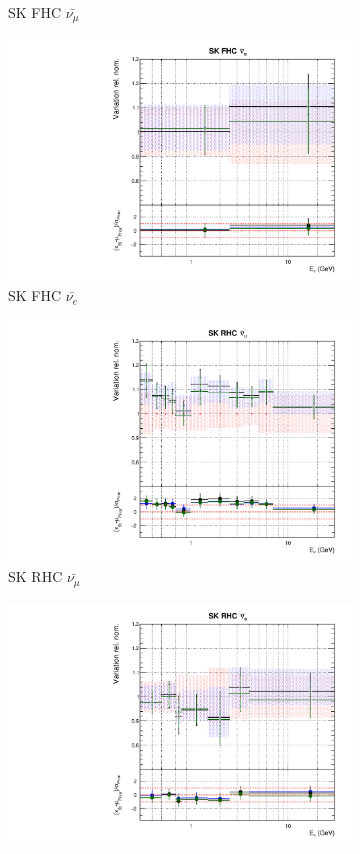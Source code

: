\begin{figure}
\begin{subfigure}{0.24\textwidth}
  \caption{SK FHC $\bar{\nu_{\mu}}$}
\end{subfigure}
\begin{subfigure}{0.24\textwidth}
  \centering
  \includegraphics[width=0.95\linewidth]{figs/polydataflux_11}
  \caption{SK FHC $\bar{\nu_{e}}$}
\end{subfigure}
\begin{subfigure}{0.24\textwidth}
  \centering
  \includegraphics[width=0.95\linewidth]{figs/polydataflux_12}
  \caption{SK RHC $\bar{\nu_{\mu}}$}
\end{subfigure}
\begin{subfigure}{0.24\textwidth}
  \centering
  \includegraphics[width=0.95\linewidth]{figs/polydataflux_13}

\end{subfigure}
\end{figure}
